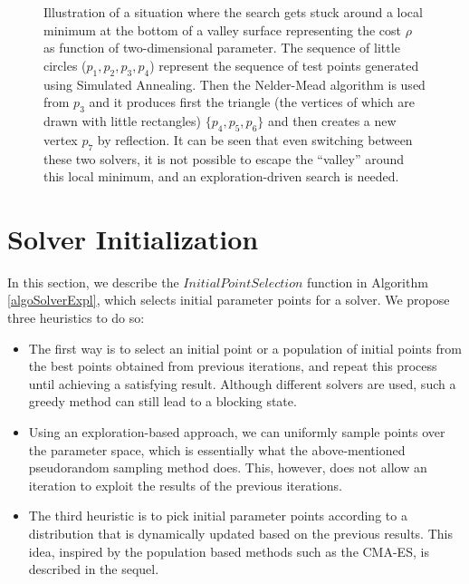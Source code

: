 \begin{figure}

\caption{Illustration of a situation where the search gets stuck around a local minimum at the bottom of a valley surface representing the cost $\rho$ as function of two-dimensional parameter. The sequence of little circles ($p_1, p_2, p_3, p_4$) represent the sequence of test points generated using Simulated Annealing. Then the Nelder-Mead algorithm is used from $p_3$ and it produces first the triangle (the vertices of which are drawn with little rectangles)  $\{p_4, p_5, p_6 \}$ and then creates a new vertex $p_7$ by reflection. It can be seen that even switching between these two solvers, it is not possible to escape the ``valley'' around this local minimum, and an exploration-driven search is needed.} 
\end{figure}

\section{Solver Initialization}\label{sec:init}

In this section, we describe the $InitialPointSelection$ function in Algorithm \ref{algoSolverExpl}, which selects initial parameter points for a solver. We propose three heuristics to do so:
\begin{itemize}
\item The first way is to select an initial point or a population of initial points from the best points obtained from previous iterations, and repeat this process until achieving a satisfying result. Although different solvers are used, such a greedy method can still lead to a blocking state. 
\item Using an exploration-based approach, we can uniformly sample points over the parameter space, which is essentially what the above-mentioned pseudorandom sampling method does. This, however, does not allow an iteration to exploit the results of the previous iterations. 
\item The third heuristic is to pick initial parameter points according to a distribution that is dynamically updated based on the previous results. This idea, inspired by the population based methods such as the CMA-ES, is described in the sequel. 
\end{itemize}
